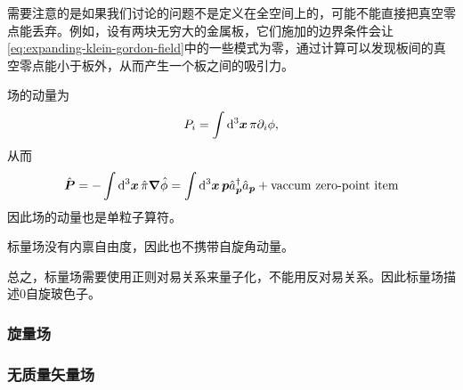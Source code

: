 \documentclass[hyperref, UTF8, a4paper]{ctexart}
\begin{document}
需要注意的是如果我们讨论的问题不是定义在全空间上的，可能不能直接把真空零点能丢弃。例如，设有两块无穷大的金属板，它们施加的边界条件会让\eqref{eq:expanding-klein-gordon-field}中的一些模式为零，通过计算可以发现板间的真空零点能小于板外，从而产生一个板之间的吸引力。

场的动量为
\[
    P_i = \int \dd[3]{\vb*{x}} \pi \partial_i \phi,
\]
从而
\begin{equation}
    \hat{\vb*{P}} = - \int \dd[3]{\vb*{x}} \hat{\pi} \grad{\hat{\phi}} = \int \dd[3]{\vb*{x}} \vb*{p} \hat{a}^\dagger_{\vb*{p}} \hat{a}_{\vb*{p}} + \text{vaccum zero-point item}
\end{equation}
因此场的动量也是单粒子算符。

标量场没有内禀自由度，因此也不携带自旋角动量。

总之，标量场需要使用正则对易关系来量子化，不能用反对易关系。因此标量场描述$0$自旋玻色子。

\subsubsection{旋量场}


\subsubsection{无质量矢量场}
\end{document}
